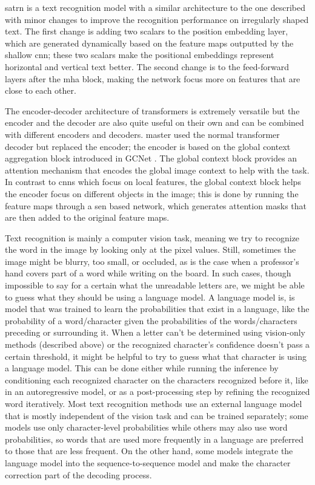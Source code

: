 \gls{satrn} \cite{lee_recognizing_2020} is a text recognition model with a similar architecture to the one described with minor changes to improve the recognition performance on irregularly shaped text. The first change is adding two scalars to the position embedding layer, which are generated dynamically based on the feature maps outputted by the shallow \gls{cnn}; these two scalars make the positional embeddings represent horizontal and vertical text better. The second change is to the feed-forward layers after the \gls{mha} block, making the network focus more on features that are close to each other.

The encoder-decoder architecture of transformers is extremely versatile but the encoder and the decoder are also quite useful on their own and can be combined with different encoders and decoders. \gls{master} \cite{lu_master_2021} used the normal transformer decoder but replaced the encoder; the encoder is based on the global context aggregation block introduced in GCNet \cite{cao_gcnet_2019}. The global context block provides an attention mechanism that encodes the global image context to help with the task. In contrast to \gls{cnn}s which focus on local features, the global context block helps the encoder focus on different objects in the image; this is done by running the feature maps through a \gls{sen} based network, which generates attention masks that are then added to the original feature maps.

Text recognition is mainly a computer vision task, meaning we try to recognize the word in the image by looking only at the pixel values. Still, sometimes the image might be blurry, too small, or occluded, as is the case when a professor's hand covers part of a word while writing on the board. In such cases, though impossible to say for a certain what the unreadable letters are, we might be able to guess what they should be using a language model. A language model is, is model that was trained to learn the probabilities that exist in a language, like the probability of a word/character given the probabilities of the words/characters preceding or surrounding it. When a letter can't be determined using vision-only methods (described above) or the recognized character's confidence doesn't pass a certain threshold, it might be helpful to try to guess what that character is using a language model. This can be done either while running the inference by conditioning each recognized character on the characters recognized before it, like in an autoregressive model, or as a post-processing step by refining the recognized word iteratively. Most text recognition methods use an external language model that is mostly independent of the vision task and can be trained separately; some models use only character-level probabilities while others may also use word probabilities, so words that are used more frequently in a language are preferred to those that are less frequent. On the other hand, some models integrate the language model into the sequence-to-sequence model and make the character correction part of the decoding process.

